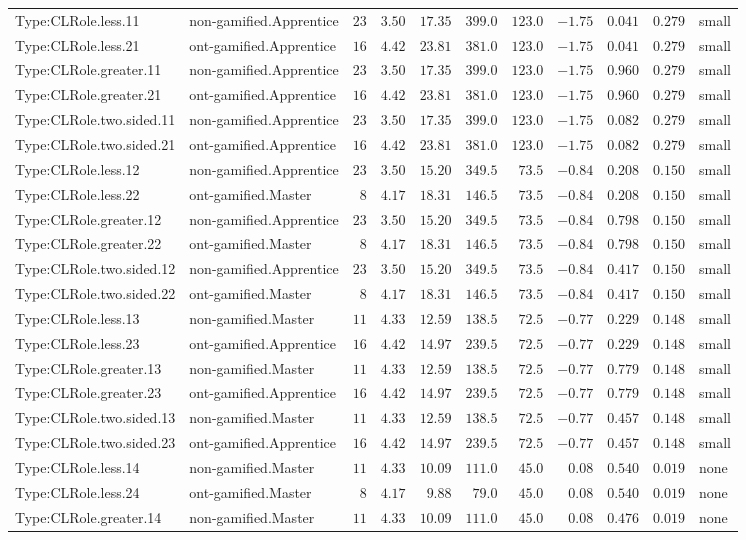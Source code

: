 \documentclass[6pt,a4paper]{article}
\begin{document}
{\begin{longtable}{llrrrrrrrrl}
Type:CLRole.less.11&non-gamified.Apprentice&$23$&$3.50$&$17.35$&$399.0$&$123.0$&$-1.75$&$0.041$&$0.279$&small\tabularnewline
Type:CLRole.less.21&ont-gamified.Apprentice&$16$&$4.42$&$23.81$&$381.0$&$123.0$&$-1.75$&$0.041$&$0.279$&small\tabularnewline
Type:CLRole.greater.11&non-gamified.Apprentice&$23$&$3.50$&$17.35$&$399.0$&$123.0$&$-1.75$&$0.960$&$0.279$&small\tabularnewline
Type:CLRole.greater.21&ont-gamified.Apprentice&$16$&$4.42$&$23.81$&$381.0$&$123.0$&$-1.75$&$0.960$&$0.279$&small\tabularnewline
Type:CLRole.two.sided.11&non-gamified.Apprentice&$23$&$3.50$&$17.35$&$399.0$&$123.0$&$-1.75$&$0.082$&$0.279$&small\tabularnewline
Type:CLRole.two.sided.21&ont-gamified.Apprentice&$16$&$4.42$&$23.81$&$381.0$&$123.0$&$-1.75$&$0.082$&$0.279$&small\tabularnewline
Type:CLRole.less.12&non-gamified.Apprentice&$23$&$3.50$&$15.20$&$349.5$&$ 73.5$&$-0.84$&$0.208$&$0.150$&small\tabularnewline
Type:CLRole.less.22&ont-gamified.Master&$ 8$&$4.17$&$18.31$&$146.5$&$ 73.5$&$-0.84$&$0.208$&$0.150$&small\tabularnewline
Type:CLRole.greater.12&non-gamified.Apprentice&$23$&$3.50$&$15.20$&$349.5$&$ 73.5$&$-0.84$&$0.798$&$0.150$&small\tabularnewline
Type:CLRole.greater.22&ont-gamified.Master&$ 8$&$4.17$&$18.31$&$146.5$&$ 73.5$&$-0.84$&$0.798$&$0.150$&small\tabularnewline
Type:CLRole.two.sided.12&non-gamified.Apprentice&$23$&$3.50$&$15.20$&$349.5$&$ 73.5$&$-0.84$&$0.417$&$0.150$&small\tabularnewline
Type:CLRole.two.sided.22&ont-gamified.Master&$ 8$&$4.17$&$18.31$&$146.5$&$ 73.5$&$-0.84$&$0.417$&$0.150$&small\tabularnewline
Type:CLRole.less.13&non-gamified.Master&$11$&$4.33$&$12.59$&$138.5$&$ 72.5$&$-0.77$&$0.229$&$0.148$&small\tabularnewline
Type:CLRole.less.23&ont-gamified.Apprentice&$16$&$4.42$&$14.97$&$239.5$&$ 72.5$&$-0.77$&$0.229$&$0.148$&small\tabularnewline
Type:CLRole.greater.13&non-gamified.Master&$11$&$4.33$&$12.59$&$138.5$&$ 72.5$&$-0.77$&$0.779$&$0.148$&small\tabularnewline
Type:CLRole.greater.23&ont-gamified.Apprentice&$16$&$4.42$&$14.97$&$239.5$&$ 72.5$&$-0.77$&$0.779$&$0.148$&small\tabularnewline
Type:CLRole.two.sided.13&non-gamified.Master&$11$&$4.33$&$12.59$&$138.5$&$ 72.5$&$-0.77$&$0.457$&$0.148$&small\tabularnewline
Type:CLRole.two.sided.23&ont-gamified.Apprentice&$16$&$4.42$&$14.97$&$239.5$&$ 72.5$&$-0.77$&$0.457$&$0.148$&small\tabularnewline
Type:CLRole.less.14&non-gamified.Master&$11$&$4.33$&$10.09$&$111.0$&$ 45.0$&$ 0.08$&$0.540$&$0.019$&none\tabularnewline
Type:CLRole.less.24&ont-gamified.Master&$ 8$&$4.17$&$ 9.88$&$ 79.0$&$ 45.0$&$ 0.08$&$0.540$&$0.019$&none\tabularnewline
Type:CLRole.greater.14&non-gamified.Master&$11$&$4.33$&$10.09$&$111.0$&$ 45.0$&$ 0.08$&$0.476$&$0.019$&none\tabularnewline

\end{longtable}}
\end{document}
